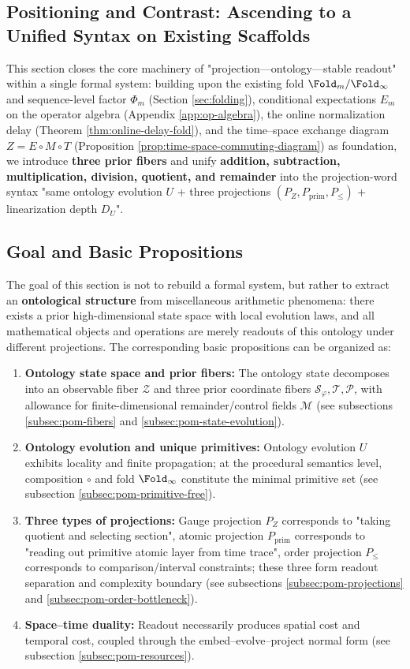 \subsection{Positioning and Contrast: Ascending to a Unified Syntax on Existing Scaffolds}\label{subsec:pom-position}
This section closes the core machinery of "projection—ontology—stable readout" within a single formal system: building upon the existing fold $\Fold_m/\Fold_\infty$ and sequence-level factor $\Phi_m$ (Section \ref{sec:folding}), conditional expectations $E_m$ on the operator algebra (Appendix \ref{app:op-algebra}), the online normalization delay (Theorem \ref{thm:online-delay-fold}), and the time–space exchange diagram $Z=E\circ M\circ T$ (Proposition \ref{prop:time-space-commuting-diagram}) as foundation, we introduce \textbf{three prior fibers} and unify \textbf{addition, subtraction, multiplication, division, quotient, and remainder} into the projection-word syntax "same ontology evolution $U$ + three projections $(P_Z,P_{\mathrm{prim}},P_{\le})$ + linearization depth $D_U$".

\subsection{Goal and Basic Propositions}\label{subsec:pom-goal}
The goal of this section is not to rebuild a formal system, but rather to extract an \textbf{ontological structure} from miscellaneous arithmetic phenomena: there exists a prior high-dimensional state space with local evolution laws, and all mathematical objects and operations are merely readouts of this ontology under different projections. The corresponding basic propositions can be organized as:
\begin{enumerate}
  \item \textbf{Ontology state space and prior fibers:} The ontology state decomposes into an observable fiber $\mathcal Z$ and three prior coordinate fibers $\mathcal S_\varphi,\mathcal T,\mathcal P$, with allowance for finite-dimensional remainder/control fields $\mathcal M$ (see subsections \ref{subsec:pom-fibers} and \ref{subsec:pom-state-evolution}).
  \item \textbf{Ontology evolution and unique primitives:} Ontology evolution $U$ exhibits locality and finite propagation; at the procedural semantics level, composition $\circ$ and fold $\Fold_\infty$ constitute the minimal primitive set (see subsection \ref{subsec:pom-primitive-free}).
  \item \textbf{Three types of projections:} Gauge projection $P_Z$ corresponds to "taking quotient and selecting section", atomic projection $P_{\mathrm{prim}}$ corresponds to "reading out primitive atomic layer from time trace", order projection $P_{\le}$ corresponds to comparison/interval constraints; these three form readout separation and complexity boundary (see subsections \ref{subsec:pom-projections} and \ref{subsec:pom-order-bottleneck}).
  \item \textbf{Space–time duality:} Readout necessarily produces spatial cost and temporal cost, coupled through the embed–evolve–project normal form (see subsection \ref{subsec:pom-resources}).
\end{enumerate}

